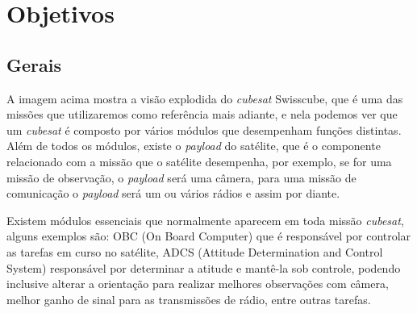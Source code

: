 \section{Objetivos}
\subsection*{Gerais}\label{gerais}

\noindent
\begin{minipage}{\linewidth}
\label{swisscube_exploded_fig}
\end{minipage}

A imagem acima mostra a visão explodida do \textit{cubesat} Swisscube, que é uma das missões que utilizaremos como referência mais adiante, e nela podemos ver que um \textit{cubesat} é composto por vários módulos que desempenham funções distintas. Além de todos os módulos, existe o \textit{payload} do satélite, que é o componente relacionado com a missão que o satélite desempenha, por exemplo, se for uma missão de observação, o \textit{payload} será uma câmera, para uma missão de comunicação o \textit{payload} será um ou vários rádios e assim por diante. 

Existem módulos essenciais que normalmente aparecem em toda missão \textit{cubesat}, alguns exemplos são: OBC (On Board Computer) que é responsável por controlar as tarefas em curso no satélite, ADCS (Attitude Determination and Control System) responsável por determinar a atitude e mantê-la sob controle, podendo inclusive alterar a orientação para realizar melhores observações com câmera, melhor ganho de sinal para as transmissões de rádio, entre outras tarefas.

